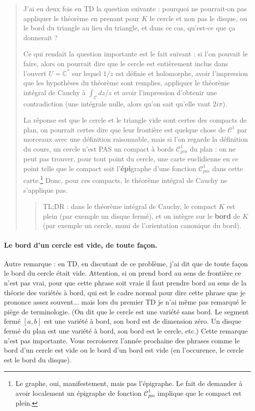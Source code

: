 \documentclass[11pt,a4paper]{article}
\newcommand{\C}{\mathbb{C}}
\theoremstyle{definition}
\theoremstyle{plain}
\begin{document}
\begin{quote}

J'ai eu deux fois en TD la question suivante : pourquoi ne pourrait-on pas appliquer le théorème en prenant pour $K$ le cercle et non pas le disque, ou le bord du triangle au lieu du triangle, et dans ce cas, qu'est-ce que ça donnerait ?

Ce qui rendait la question importante est le fait suivant : si l'on pouvait le faire, alors on pourrait dire que le cercle est entièrement inclus dans l'ouvert $U=\C^*$ sur lequel $1/z$ est définie et holomorphe, avoir l'impression que les hypothèses du théorème sont remplies, appliquer le théorème intégral de Cauchy à $\int_{\mathcal C} dz/z$ et avoir l'impression d'obtenir une contradiction (une intégrale nulle, alors qu'on sait qu'elle vaut $2i\pi$).

La réponse est que le cercle et le triangle \og vide\fg{} sont certes des compacts de plan, on pourrait certes dire que leur frontière est quelque chose de $\mathcal C^1$ par morceaux avec une définition raisonnable, mais si l'on regarde la définition du cours, un cercle n'est PAS un compact à bords $\mathcal C^1_{pm}$ du plan : on ne peut pas trouver, pour tout point du cercle, une carte euclidienne en ce point telle que le compact soit l'\textbf{épi}graphe d'une fonction $\mathcal C^1_{pm}$ dans cette carte.\footnote{Le graphe, oui, manifestement, mais pas l'épigraphe. Le fait de demander à avoir localement un épigraphe de fonction $\mathcal C^1_{pm}$ implique que le compact est \og plein\fg.} Donc, pour ces compacts, le théorème intégral de Cauchy ne s'applique pas.
\begin{quote}
TL;DR : dans le théorème intégral de Cauchy, le compact $K$ est \og plein\fg{} (par exemple un disque fermé), et on intègre sur le \textbf{bord} de $K$ (par exemple un  cercle, muni de l'orientation canonique du bord).
\end{quote}
\end{quote}

\paragraph{\og Le bord d'un  cercle est vide, de toute façon.\fg}
Autre remarque : en TD, en discutant de ce problème, j'ai dit que de toute façon le bord du cercle était vide. Attention, si on prend \og bord\fg{} au sens de frontière ce n'est pas vrai, pour que cette phrase soit vraie il faut prendre \og bord\fg{} au sens de la théorie des \og variétés à bord\fg{}, qui est le cadre normal pour dire cette phrase que je prononce assez souvent... mais lors du premier TD je n'ai même pas remarqué le piège de terminologie.
(On dit que le cercle est une variété sans bord. Le segment fermé $[a,b]$ est une variété à bord, son bord est de dimension zéro. Un disque fermé du plan est une variété à bord, son bord est le cercle, etc.) Cette remarque n'est pas importante. Vous recroiserez l'année prochaine des phrases comme \og le bord d'un cercle est vide\fg{} ou \og le bord d'un bord est vide\fg{} (en l'occurence, le cercle est le bord du disque).
\end{document}
